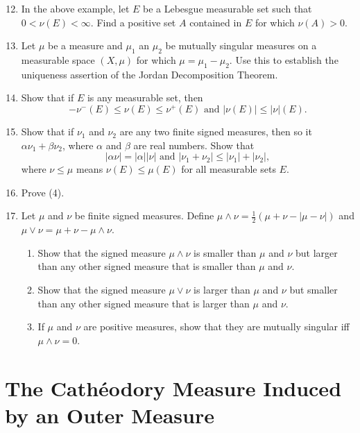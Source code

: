 \begin{enumerate}
	\setcounter{enumi}{11}
	\item In the above example, let $E$ be a Lebesgue measurable set such that $0<\nu(E)<\infty$.
	Find a positive set $A$ contained in $E$ for which $\nu(A)>0$.
	\item Let $\mu$ be a measure and $\mu_1$ an $\mu_2$ be mutually singular measures on a measurable space $(X,\mu)$ for which $\mu=\mu_1-\mu_2$.
	Use this to establish the uniqueness assertion of the Jordan Decomposition Theorem.
	\item Show that if $E$ is any measurable set, then
	\[
		-\nu^-(E)\le\nu(E)\le\nu^+(E)\text{ and }|\nu(E)|\le|\nu|(E).	
	\]
	\item Show that if $\nu_1$ and $\nu_2$ are any two finite signed measures, then so it $\alpha\nu_1+\beta\nu_2$, where $\alpha$ and $\beta$ are real numbers. Show that
	\[
		|\alpha\nu|=|\alpha||\nu|\text{ and }|\nu_1+\nu_2|\le|\nu_1|+|\nu_2|,
	\]
	where $\nu\le\mu$ means $\nu(E)\le\mu(E)$ for all measurable sets $E$.
	\item Prove (4).
	\item Let $\mu$ and $\nu$ be finite signed measures.
	Define $\mu\land\nu=\frac{1}{2}(\mu+\nu-|\mu-\nu|)$ and $\mu\lor\nu=\mu+\nu-\mu\land\nu$.
	\begin{enumerate}[label=(\roman*),align=left]  
		\item Show that the signed measure $\mu\land\nu$ is smaller than $\mu$ and $\nu$ but larger than any other signed measure that is smaller than $\mu$ and $\nu$.
		\item Show that the signed measure $\mu\lor\nu$ is larger than $\mu$ and $\nu$ but smaller than any other signed measure that is larger than $\mu$ and $\nu$.
		\item If $\mu$ and $\nu$ are positive measures, show that they are mutually singular iff $\mu\land\nu=0$.
	\end{enumerate}
\end{enumerate}

\section{The Cath\'eodory Measure Induced by an Outer Measure}

